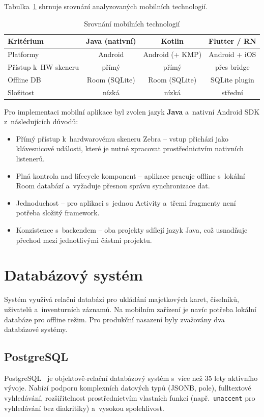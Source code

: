 Tabulka~\ref{tab:mobile-comparison} shrnuje srovnání analyzovaných mobilních technologií.

\begin{table}[htbp]\centering\footnotesize
\caption{Srovnání mobilních technologií}\label{tab:mobile-comparison}
\begin{tabular}{l|c|c|c}
	\textbf{Kritérium} & \textbf{Java (nativní)} & \textbf{Kotlin} & \textbf{Flutter / RN} \tabularnewline \hline
	Platformy & Android & Android (+ KMP) & Android + iOS \tabularnewline
	Přístup k~HW skeneru & přímý & přímý & přes bridge \tabularnewline
	Offline DB & Room (SQLite) & Room (SQLite) & SQLite plugin \tabularnewline
	Složitost & nízká & nízká & střední \tabularnewline
\end{tabular}
\end{table}

Pro implementaci mobilní aplikace byl zvolen jazyk \textbf{Java} a~nativní Android SDK z~následujících důvodů:
\begin{itemize}
	\item Přímý přístup k~hardwarovému skeneru Zebra -- vstup přichází jako klávesnicové události, které je nutné zpracovat prostřednictvím nativních listenerů.
	\item Plná kontrola nad lifecycle komponent -- aplikace pracuje offline s~lokální Room databází a~vyžaduje přesnou správu synchronizace dat.
	\item Jednoduchost -- pro aplikaci s~jednou Activity a~třemi fragmenty není potřeba složitý framework.
	\item Konzistence s~backendem -- oba projekty sdílejí jazyk Java, což usnadňuje přechod mezi jednotlivými částmi projektu.
\end{itemize}


\section{Databázový systém}

Systém využívá relační databázi pro ukládání majetkových karet, číselníků, uživatelů a~inventurních záznamů. Na mobilním zařízení je navíc potřeba lokální databáze pro offline režim. Pro produkční nasazení byly zvažovány dva databázové systémy.

\subsection{PostgreSQL}

PostgreSQL~\cite{postgresql} je objektově-relační databázový systém s~více než 35 lety aktivního vývoje. Nabízí podporu komplexních datových typů (JSONB, pole), fulltextové vyhledávání, rozšiřitelnost prostřednictvím vlastních funkcí (např.\ \texttt{unaccent} pro vyhledávání bez diakritiky) a~vysokou spolehlivost.

